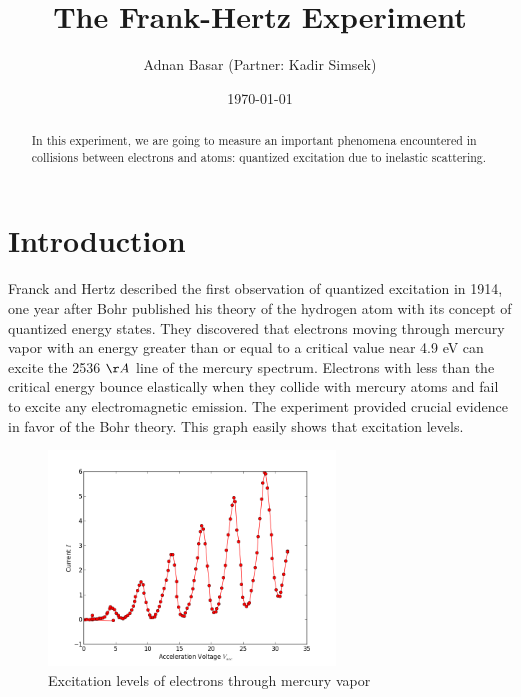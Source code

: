 \documentclass[aps,twocolumn,secnumarabic,nobalancelastpage,amsmath,amssymb,
nofootinbib]{revtex4}
\begin{document}
\title{The Frank-Hertz Experiment}
\author         {Adnan Basar (Partner: Kadir Simsek)}
\date{\today}





\begin{abstract}
In this experiment, we are going to measure an important phenomena encountered in collisions between electrons and atoms: quantized excitation due to inelastic scattering.
\end{abstract}

\maketitle

\section{Introduction}

Franck and Hertz described the first observation of quantized excitation in 1914, one year after Bohr published his theory of the hydrogen atom with its concept of
quantized energy states. They discovered that electrons
moving through mercury vapor with an energy greater
than or equal to a critical value near 4.9 eV can excite
the 2536 $\AA$ line of the mercury spectrum. Electrons with
less than the critical energy bounce elastically when they
collide with mercury atoms and fail to excite any electromagnetic emission. The experiment provided crucial
evidence in favor of the Bohr theory. This graph easily shows that excitation levels.

\begin{figure}[htbp]
\includegraphics[width=3in]{sample}
\caption{Excitation levels of electrons through mercury vapor}
\label{fig:schematic}
\end{figure}
\end{document}
